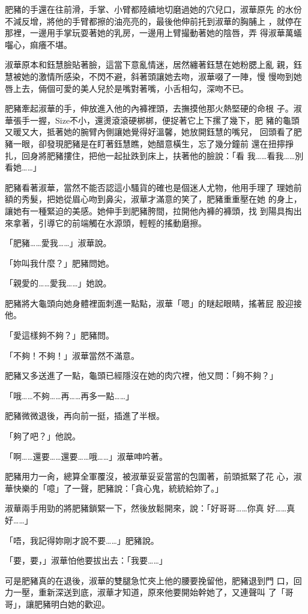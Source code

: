 肥豬的手還在往前滑，手掌、小臂都陸續地切磨過她的穴兒口，淑華原先
的水份不減反增，將他的手臂都擦的油亮亮的，最後他伸前托到淑華的胸脯上
，就停在那裡，一邊用手掌玩耍著她的乳房，一邊用上臂撮動著她的陰唇，弄
得淑華萬蟻囓心，痲癢不堪。

淑華原本和鈺慧臉貼著臉，這當下意亂情迷，居然纏著鈺慧在她粉腮上亂
親，鈺慧被她的激情所感染，不閃不避，斜著頭讓她去吻，淑華啜了一陣，慢
慢吻到她唇上去，倆個可愛的美人兒於是嘴對著嘴，小舌相勾，深吻不已。

肥豬牽起淑華的手，伸放進入他的內褲裡頭，去撫摸他那火熱堅硬的命根
子。淑華張手一握，Size不小，還燙滾滾硬梆梆，便捉著它上下摞了幾下，肥
豬的龜頭又暖又大，抵著她的腕臂內側讓她覺得好溫馨，她放開鈺慧的嘴兒，
回頭看了肥豬一眼，卻發現肥豬是在盯著鈺慧瞧，她醋意橫生，忘了幾分鐘前
還在扭擰掙扎，回身將肥豬摟住，把他一起扯跌到床上，扶著他的臉說：「看
我……看我……別看她……」

肥豬看著淑華，當然不能否認這小騷貨的確也是個迷人尤物，他用手理了
理她前額的秀髮，把她從眉心吻到鼻尖，淑華才滿意的笑了，肥豬重重壓在她
的身上，讓她有一種緊迫的美感。她伸手到肥豬胯間，拉開他內褲的褲頭，找
到陽具掏出來拿著，引導它的前端觸在水源頭，輕輕的搖動磨擦。

「肥豬……愛我……」淑華說。

「妳叫我什麼？」肥豬問她。

「親愛的……愛我……」她說。

肥豬將大龜頭向她身體裡面刺進一點點，淑華「嗯」的瞇起眼睛，搖著屁
股迎接他。

「愛這樣夠不夠？」肥豬問。

「不夠！不夠！」淑華當然不滿意。

肥豬又多送進了一點，龜頭已經隱沒在她的肉穴裡，他又問：「夠不夠？」

「哦……不夠……再……再多一點……」

肥豬微微退後，再向前一挺，插進了半根。

「夠了吧？」他說。

「啊……還要……還要……哦……」淑華呻吟著。

肥豬用力一肏，總算全軍覆沒，被淑華妥妥當當的包圍著，前頭抵緊了花
心，淑華快樂的「噫」了一聲，肥豬說：「貪心鬼，統統給妳了。」

淑華兩手用勁的將肥豬鎖緊一下，然後放鬆開來，說：「好哥哥……你真
好……真好……」

「唔，我記得妳剛才說不要……」肥豬說。

「要，要，」淑華怕他要拔出去：「我要……」

可是肥豬真的在退後，淑華的雙腿急忙夾上他的腰要挽留他，肥豬退到門
口，回力一壓，重新深送到底，淑華才知道，原來他要開始幹她了，又連聲叫
了「哥哥」，讓肥豬明白她的歡迎。

